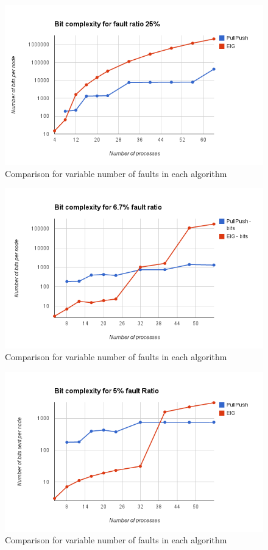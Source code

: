 \begin{figure}[h]
 \centering
\includegraphics[scale=0.4]{Fault33}
\caption{ Comparison for variable number of faults in each algorithm}
 \label{fig:fault33}
\end{figure}

\begin{figure}[h]
 \centering
\includegraphics[scale=0.4]{Fault667}
\caption{ Comparison for variable number of faults in each algorithm}
 \label{fig:fault667}
\end{figure}

\begin{figure}[h]
 \centering
\includegraphics[scale=0.4]{Fault5}
\caption{ Comparison for variable number of faults in each algorithm}
 \label{fig:fault5}
\end{figure}

